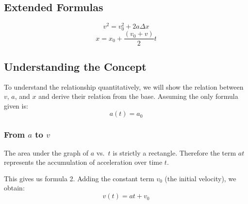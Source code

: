 \documentclass[]{article}
\begin{document}
	\subsection{Extended Formulas}
		\[v^2 = v_0^2+2a\Delta x\]
		\[x=x_0+\frac{(v_0+v)}{2}t\]
	
	\subsection{Understanding the Concept}
		To understand the relationship quantitatively, we will show the relation between $v$, $a$, and $x$ and derive their relation from the base.
		Assuming the only formula given is:
		\[a(t) = a_0\]
		
		\subsubsection*{From $a$ to $v$}
		The area under the graph of $a$ vs.\ $t$ is strictly a rectangle. Therefore the term $at$ represents the accumulation of acceleration over time $t$.
		\begin{center}
		\end{center}
		This gives us formula 2. Adding the constant term $v_0$ (the initial velocity), we obtain:
		\[v(t) = at + v_0\]
		
\end{document}
